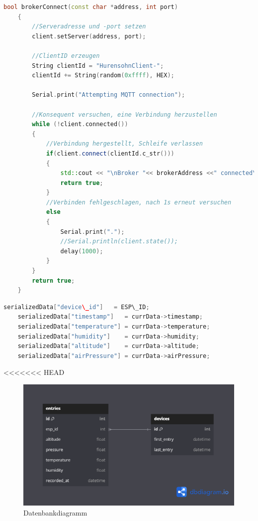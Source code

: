 \begin{lstlisting}[language=C++,caption={MQTT Connect}, label=lst:mqttconnect]
	bool brokerConnect(const char *address, int port)
	{
		//Serveradresse und -port setzen
		client.setServer(address, port);
		
		//ClientID erzeugen
		String clientId = "HurensohnClient-";
		clientId += String(random(0xffff), HEX);
		
		Serial.print("Attempting MQTT connection");
		
		//Konsequent versuchen, eine Verbindung herzustellen
		while (!client.connected()) 
		{
			//Verbindung hergestellt, Schleife verlassen
			if(client.connect(clientId.c_str()))
			{
				std::cout << "\nBroker "<< brokerAddress <<" connected\n" << std::endl;
				return true;
			}
			//Verbinden fehlgeschlagen, nach 1s erneut versuchen
			else
			{
				Serial.print(".");
				//Serial.println(client.state());
				delay(1000);
			}
		}
		return true;
	}
\end{lstlisting}

\begin{lstlisting}[language=C++,caption={Write Json}, label=lst:writejson]
	serializedData["device\_id"]   = ESP\_ID;
	serializedData["timestamp"]   = currData->timestamp;
	serializedData["temperature"] = currData->temperature;
	serializedData["humidity"]    = currData->humidity;
	serializedData["altitude"]    = currData->altitude;
	serializedData["airPressure"] = currData->airPressure;
\end{lstlisting}

<<<<<<< HEAD
\begin{figure}[H]
	\centering
	\includegraphics[width=15cm]{images/db_diagram.png}
	\caption{Datenbankdiagramm}
	\label{fig:db_diagram}
\end{figure}

